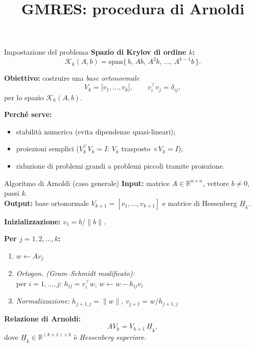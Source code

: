 \documentclass{beamer}
\title{GMRES: procedura di Arnoldi}
\author{}
\institute{}
\date{}
\begin{document}
\frame{\titlepage}


\begin{frame}{Impostazione del problema}
\textbf{Spazio di Krylov di ordine $k$:}
\[
\mathcal{K}_k(A,b)=\mathrm{span}\{\,b,\,Ab,\,A^2 b,\,\dots,\,A^{k-1}b\,\}.
\]
\medskip

\textbf{Obiettivo:} costruire una \emph{base ortonormale}
\[
V_k=\bigl[v_1,\dots,v_k\bigr], \qquad v_i^\top v_j=\delta_{ij},
\]
per lo spazio $\mathcal{K}_k(A,b)$.
\medskip

\textbf{Perché serve:}
\begin{itemize}
  \item stabilità numerica (evita dipendenze quasi-lineari);
  \item proiezioni semplici ($V_k^\top V_k=I$: $V_k$ trasposto $\times V_k=I$);
  \item riduzione di problemi grandi a problemi piccoli tramite proiezione.
\end{itemize}
\end{frame}

\begin{frame}{Algoritmo di Arnoldi (caso generale)}
\textbf{Input:} matrice $A\in\mathbb{R}^{n\times n}$, vettore $b\neq 0$, passi $k$.\\
\textbf{Output:} base ortonormale $V_{k+1}=[v_1,\dots,v_{k+1}]$ e matrice di Hessenberg $\underline H_k$.
\medskip

\textbf{Inizializzazione:} \quad $v_1 = b/\|b\|$.

\medskip
\textbf{Per $j=1,2,\dots,k$:}
\begin{enumerate}
  \item $w \leftarrow A v_j$
  \item \textit{Ortogon. (Gram–Schmidt modificato):}\\
    per $i=1,\dots,j$: \; $h_{ij}=v_i^\top w$, \quad $w \leftarrow w - h_{ij} v_i$
  \item \textit{Normalizzazione:} \quad $h_{j+1,j}=\|w\|$, \; $v_{j+1} = w / h_{j+1,j}$
\end{enumerate}

\medskip
\textbf{Relazione di Arnoldi:}\quad
\[
A V_k = V_{k+1}\,\underline H_k,
\]
dove $\underline H_k\in\mathbb{R}^{(k+1)\times k}$ è \emph{Hessenberg superiore}.
\end{frame}
\end{document}
